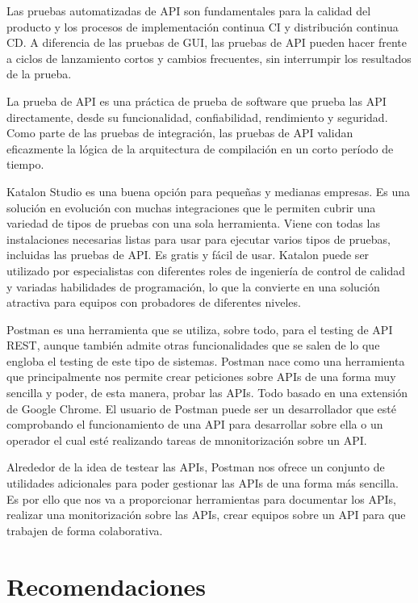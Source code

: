 \documentclass[twoside,twocolumn]{article}
\begin{document}
Las pruebas automatizadas de API son fundamentales para la calidad del producto y los procesos de implementación continua CI y distribución continua CD. A diferencia de las pruebas de GUI, las pruebas de API pueden hacer frente a ciclos de lanzamiento cortos y cambios frecuentes, sin interrumpir los resultados de la prueba.

La prueba de API es una práctica de prueba de software que prueba las API directamente, desde su funcionalidad, confiabilidad, rendimiento y seguridad. Como parte de las pruebas de integración, las pruebas de API validan eficazmente la lógica de la arquitectura de compilación en un corto período de tiempo. 

Katalon Studio es una buena opción para pequeñas y medianas empresas. Es una solución en evolución con muchas integraciones que le permiten cubrir una variedad de tipos de pruebas con una sola herramienta. Viene con todas las instalaciones necesarias listas para usar para ejecutar varios tipos de pruebas, incluidas las pruebas de API. Es gratis y fácil de usar. Katalon puede ser utilizado por especialistas con diferentes roles de ingeniería de control de calidad y variadas habilidades de programación, lo que la convierte en una solución atractiva para equipos con probadores de diferentes niveles.

Postman es una herramienta que se utiliza, sobre todo, para el testing de API REST, aunque también admite otras funcionalidades que se salen de lo que engloba el testing de este tipo de sistemas. Postman nace como una herramienta que principalmente nos permite crear peticiones sobre APIs de una forma muy sencilla y poder, de esta manera, probar las APIs. Todo basado en una extensión de Google Chrome. El usuario de Postman puede ser un desarrollador que esté comprobando el funcionamiento de una API para desarrollar sobre ella o un operador el cual esté realizando tareas de mnonitorización sobre un API.

Alrededor de la idea de testear las APIs, Postman nos ofrece un conjunto de utilidades adicionales para poder gestionar las APIs de una forma más sencilla. Es por ello que nos va a proporcionar herramientas para documentar los APIs, realizar una monitorización sobre las APIs, crear equipos sobre un API para que trabajen de forma colaborativa.

\section{Recomendaciones}
\end{document}
